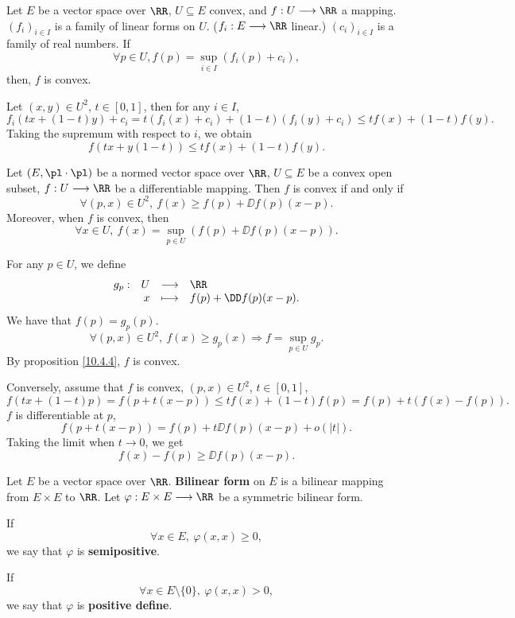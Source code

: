 \begin{propositionenv}\label{10.4.4}
    Let $E$ be a vector space over $\RR$, $U\subseteq E$ convex, and $f:U\longrightarrow \RR$ a mapping. $(f_i)_{i\in I}$ is a family of linear forms on $U$. ($f_i: E\longrightarrow \RR$ linear.) $(c_i)_{i\in I}$ is a family of real numbers.
    If
    $$ \forall p\in U, f(p)=\sup_{i\in I} (f_i(p)+c_i),$$
    then, $f$ is convex.
\end{propositionenv}
\begin{proofenv}
    Let $(x,y)\in U^2$, $t\in [0,1]$, then for any $i\in I$,
    $$f_{i}(tx+(1-t)y)+c_i= t(f_i(x)+c_i)+(1-t)(f_i(y)+c_i)\le tf(x) +(1-t)f(y).$$
    Taking the supremum with respect to $i$, we obtain
    $$ f(tx+y(1-t))\le tf(x)+(1-t)f(y).$$
\end{proofenv}
\begin{propositionenv}
    Let $(E,\pl \cdot\pl)$ be a normed vector space over $\RR$, $U\subseteq E$ be a convex open subset, $f:U\longrightarrow\RR$ be a differentiable mapping.
    Then $f$ is convex if and only if
    $$ \forall (p,x)\in U^2, \ f(x)\ge f(p)+ \DD f(p)(x-p).$$
    Moreover, when $f$ is convex, then
    $$ \forall x\in U, \ f(x)=\sup_{p\in U}\left(f(p)+\DD f(p)(x-p)\right).$$
\end{propositionenv}
\begin{proofenv}
    For any $p\in U$, we define
    $$\begin{array}{rrcl}
        g_p: &U&\longrightarrow &\RR\\
        &x&\longmapsto &f(p)+\DD f(p)(x-p). 
    \end{array}$$
    We have that $f(p)=g_p(p)$.
    $$ \forall (p,x)\in U^2,\ f(x)\ge g_p(x) \Rightarrow f=\sup_{p\in U} g_p.$$
    By proposition \ref{10.4.4},  $f$ is convex. 

    \quad Conversely, assume that $f$ is convex, $(p,x)\in U^2$, $t\in[0,1]$,
    $$ f(tx+(1-t)p)= f(p+t(x-p))\le t f(x) +(1-t) f(p)=f(p)+t(f(x)-f(p)).$$
    $f$ is differentiable at $p$,
    $$ f(p+t(x-p))=f(p)+t \DD f(p)(x-p)+o(|t|).$$
    Taking the limit when $t\rightarrow 0$, we get
    $$ f(x)-f(p)\ge \DD f(p)(x-p).$$
\end{proofenv}
\begin{definitionenv}
    Let $E$ be a vector space over $\RR$. \textbf{Bilinear form} on $E$ is a bilinear mapping from $E\times E$ to $\RR$. Let $\varphi: E\times E\longrightarrow \RR $ be a symmetric bilinear form.
    
    If 
    $$ \forall x\in E, \ \varphi(x,x)\ge 0,$$
    we say that $\varphi$ is \textbf{semipositive}.

    If
    $$ \forall x\in E\setminus\{0\}, \ \varphi(x,x)>0,$$
    we say that $\varphi$ is \textbf{positive define}.
\end{definitionenv}
